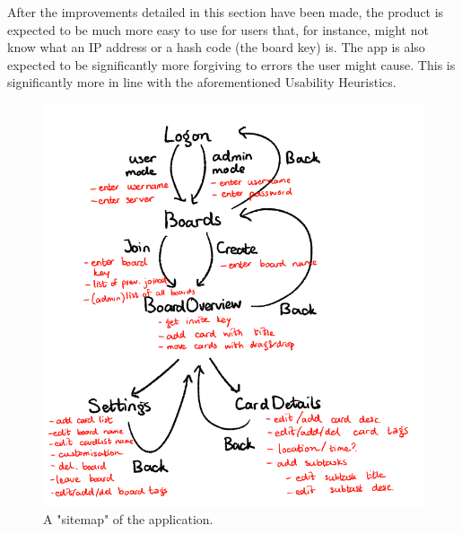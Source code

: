 After the improvements detailed in this section have been made, the product is expected to be much more easy to use for users that, for instance, might not know what an IP address or a hash code (the board key) is. The app is also expected to be significantly more forgiving to errors the user might cause. This is significantly more in line with the aforementioned Usability Heuristics.

\begin{figure}
    \includegraphics{mocks/hue_mock_flow.png}
    \caption{A "sitemap" of the application.}
\end{figure}

